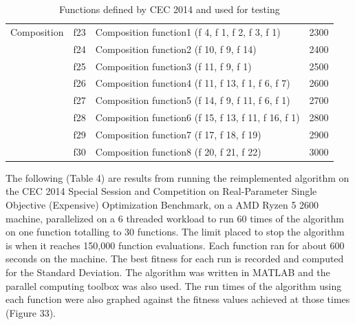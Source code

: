 \begin{table}[]
\begin{tabular}{llll}
  Composition
    & f23 & Composition function1 (f 4, f 1, f 2, f 3, f 1) & 2300 \\
    & f24 & Composition function2 (f 10, f 9, f 14) & 2400 \\
    & f25 & Composition function3 (f 11, f 9, f 1) & 2500 \\
    & f26 & Composition function4 (f 11, f 13, f 1, f 6, f 7) & 2600 \\
    & f27 & Composition function5 (f 14, f 9, f 11, f 6, f 1) & 2700 \\
    & f28 & Composition function6 (f 15, f 13, f 11, f 16, f 1) & 2800 \\
    & f29 & Composition function7 (f 17, f 18, f 19) & 2900 \\
    & f30 & Composition function8 (f 20, f 21, f 22) & 3000
\end{tabular}
\caption{Functions defined by CEC 2014 and used for testing}
\end{table}

\clearpage

The following (Table 4) are results from running the reimplemented algorithm on the CEC 2014 Special Session and Competition on Real-Parameter Single Objective (Expensive) Optimization Benchmark\cite{liang_2013}, on a AMD Ryzen 5 2600 machine, parallelized on a 6 threaded workload to run 60 times of the algorithm on one function totalling to 30 functions. The limit placed to stop the algorithm is when it reaches 150,000 function evaluations. Each function ran for about 600 seconds on the machine. The best fitness for each run is recorded and computed for the Standard Deviation. The algorithm was written in MATLAB and the parallel computing toolbox was also used. The run times of the algorithm using each function were also graphed against the fitness values achieved at those times (Figure 33).


